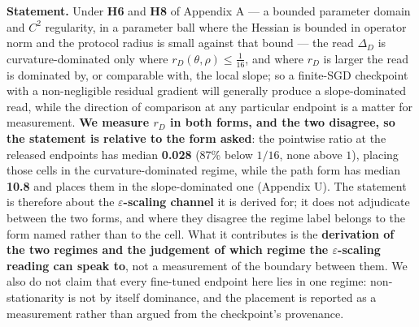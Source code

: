 \documentclass[pdflatex,sn-mathphys-ay]{sn-jnl}
\begin{document}
\textbf{Statement.} Under \textbf{H6} and \textbf{H8} of Appendix A --- a bounded parameter domain and $C^2$ regularity, in a parameter ball where the Hessian is bounded in operator norm and the protocol radius is small against that bound --- the read $\Delta_D$ is curvature-dominated only where $r_D(\theta,\rho)\le\tfrac1{16}$, and where $r_D$ is larger the read is dominated by, or comparable with, the local slope; so a finite-SGD checkpoint with a non-negligible residual gradient will generally produce a slope-dominated read, while the direction of comparison at any particular endpoint is a matter for measurement. \textbf{We measure $r_D$ in both forms, and the two disagree, so the statement is relative to the form asked}: the pointwise ratio at the released endpoints has median \textbf{0.028} (87\% below $1/16$, none above $1$), placing those cells in the curvature-dominated regime, while the path form has median \textbf{10.8} and places them in the slope-dominated one (Appendix U). The statement is therefore about the \textbf{$\varepsilon$-scaling channel} it is derived for; it does not adjudicate between the two forms, and where they disagree the regime label belongs to the form named rather than to the cell. What it contributes is the \textbf{derivation of the two regimes and the judgement of which regime the \ensuremath{\varepsilon}-scaling reading can speak to}, not a measurement of the boundary between them. We also do not claim that every fine-tuned endpoint here lies in one regime: non-stationarity is not by itself dominance, and the placement is reported as a measurement rather than argued from the checkpoint's provenance.
\end{document}
